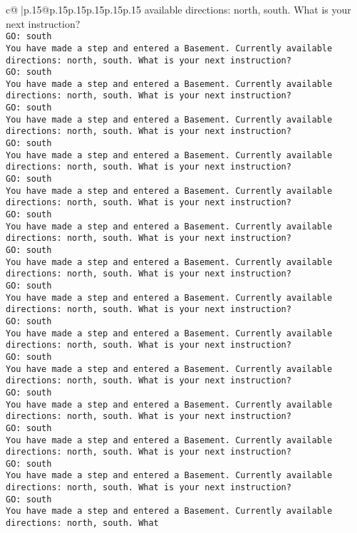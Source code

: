 \documentclass{article}
\begin{document}
{\begin{supertabular}{c@{$\;$}|p{.15\linewidth}@{}p{.15\linewidth}p{.15\linewidth}p{.15\linewidth}p{.15\linewidth}p{.15\linewidth}}
{{{available directions: north, south. What is your next instruction?\\ \tt GO: south\\ \tt You have made a step and entered a Basement. Currently available directions: north, south. What is your next instruction?\\ \tt GO: south\\ \tt You have made a step and entered a Basement. Currently available directions: north, south. What is your next instruction?\\ \tt GO: south\\ \tt You have made a step and entered a Basement. Currently available directions: north, south. What is your next instruction?\\ \tt GO: south\\ \tt You have made a step and entered a Basement. Currently available directions: north, south. What is your next instruction?\\ \tt GO: south\\ \tt You have made a step and entered a Basement. Currently available directions: north, south. What is your next instruction?\\ \tt GO: south\\ \tt You have made a step and entered a Basement. Currently available directions: north, south. What is your next instruction?\\ \tt GO: south\\ \tt You have made a step and entered a Basement. Currently available directions: north, south. What is your next instruction?\\ \tt GO: south\\ \tt You have made a step and entered a Basement. Currently available directions: north, south. What is your next instruction?\\ \tt GO: south\\ \tt You have made a step and entered a Basement. Currently available directions: north, south. What is your next instruction?\\ \tt GO: south\\ \tt You have made a step and entered a Basement. Currently available directions: north, south. What is your next instruction?\\ \tt GO: south\\ \tt You have made a step and entered a Basement. Currently available directions: north, south. What is your next instruction?\\ \tt GO: south\\ \tt You have made a step and entered a Basement. Currently available directions: north, south. What is your next instruction?\\ \tt GO: south\\ \tt You have made a step and entered a Basement. Currently available directions: north, south. What is your next instruction?\\ \tt GO: south\\ \tt You have made a step and entered a Basement. Currently available directions: north, south. What }}}
\end{supertabular}}
\end{document}
